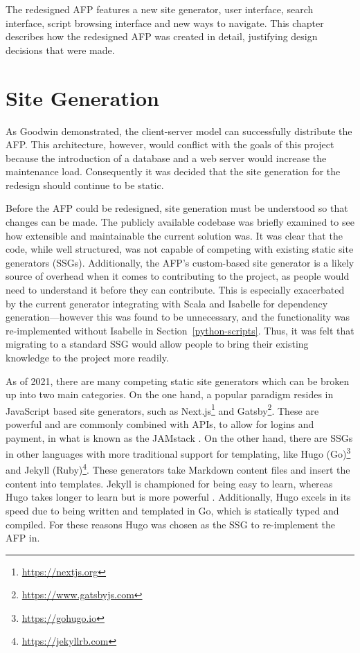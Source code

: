 \documentclass[bsc,frontabs,oneside,singlespacing,parskip,deptreport,logo]{infthesis}
\begin{document}
The redesigned AFP features a new site generator, user interface, search interface, script browsing interface and new ways to navigate. This chapter describes how the redesigned AFP was created in detail, justifying design decisions that were made.

\section{Site Generation} \label{implemenation-ssg}


As Goodwin \cite{Goodwin2020} demonstrated, the client-server model can successfully distribute the AFP\@. This architecture, however, would conflict with the goals of this project because the introduction of a database and a web server would increase the maintenance load. Consequently it was decided that the site generation for the redesign should continue to be static.


Before the AFP could be redesigned, site generation must be understood so that changes can be made. The publicly available codebase was briefly examined to see how extensible and maintainable the current solution was.  It was clear that the code, while well structured, was not capable of competing with existing static site generators (SSGs). Additionally, the AFP's custom-based site generator is a likely source of overhead when it comes to contributing to the project, as people would need to understand it before they can contribute. This is especially exacerbated by the current generator integrating with Scala and Isabelle for dependency generation---however this was found to be unnecessary, and the functionality was re-implemented without Isabelle in Section~\ref{python-scripts}. Thus, it was felt that migrating to a standard SSG would allow people to bring their existing knowledge to the project more readily.


As of 2021, there are many competing static site generators which can be broken up into two main categories. On the one hand, a popular paradigm resides in JavaScript based site generators, such as Next.js\footnote{\url{https://nextjs.org}} and Gatsby\footnote{\url{https://www.gatsbyjs.com}}. These are powerful and are commonly combined with APIs, to allow for logins and payment, in what is known as the JAMstack \cite{jamstack}. On the other hand, there are SSGs in other languages with more traditional support for templating, like Hugo (Go)\footnote{\url{https://gohugo.io}} and Jekyll (Ruby)\footnote{\url{https://jekyllrb.com}}. These generators take Markdown \cite{gruber_markdown_2004} content files and insert the content into templates. Jekyll is championed for being easy to learn, whereas Hugo takes longer to learn but is more powerful \cite{macrae_hugo_2018}. Additionally, Hugo excels in its speed due to being written and templated in Go, which is statically typed and compiled. For these reasons Hugo was chosen as the SSG to re-implement the AFP in.
\end{document}
